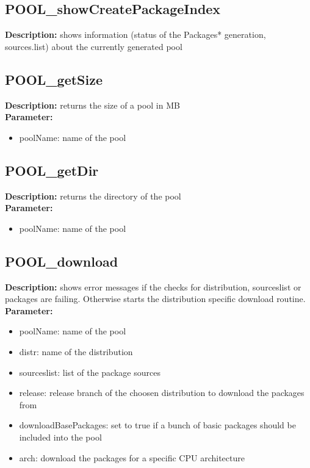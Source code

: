 \subsection{POOL\_showCreatePackageIndex}
\textbf{Description:} shows information (status of the Packages* generation, sources.list) about the currently generated pool\\

\subsection{POOL\_getSize}
\textbf{Description:} returns the size of a pool in MB\\
\textbf{Parameter:}
\begin{itemize}
\item poolName: name of the pool
\end{itemize}

\subsection{POOL\_getDir}
\textbf{Description:} returns the directory of the pool\\
\textbf{Parameter:}
\begin{itemize}
\item poolName: name of the pool
\end{itemize}

\subsection{POOL\_download}
\textbf{Description:} shows error messages if the checks for distribution, sourceslist or packages are failing. Otherwise starts the distribution specific download routine.\\
\textbf{Parameter:}
\begin{itemize}
\item poolName: name of the pool
\item distr: name of the distribution
\item sourceslist: list of the package sources
\item release: release branch of the choosen distribution to download the packages from
\item downloadBasePackages: set to true if a bunch of basic packages should be included into the pool
\item arch: download the packages for a specific CPU architecture
\end{itemize}

